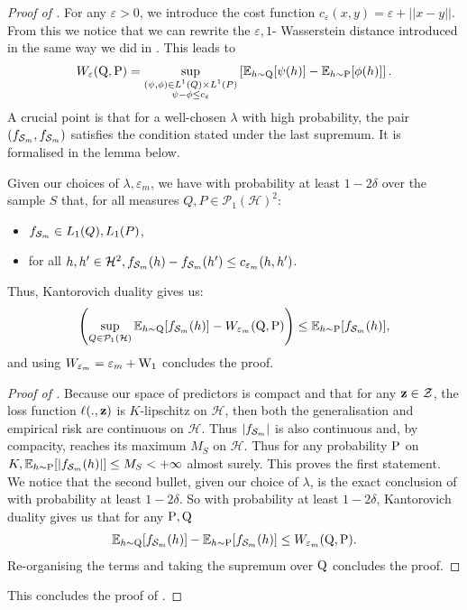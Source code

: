 \begin{noaddcontents}
\begin{proof}[Proof of ]
For any $\varepsilon>0$, we introduce the cost function $c_{\varepsilon}(x,y)= \varepsilon + ||x-y||$.
From this we notice that we can rewrite the $\varepsilon,1$- Wasserstein distance introduced in  the same way we did in . This leads to
\begin{align*}
W_\varepsilon(\Q,\P)= \sup_{\substack{(\psi, \phi) \in L^1(Q) \times L^1(P)\\ \psi-\phi \leq c_{\varepsilon}}}\left[\mathbb{E}_{h\sim \Q}[ \psi(h)]- \mathbb{E}_{h\sim \P}[ \phi(h)]\right].
\end{align*}
A crucial point is that for a well-chosen $\lambda$ with high probability, the pair $(f_{\Sm},f_{\Sm})$ satisfies the condition stated under the last supremum. It is formalised in the lemma below.
\begin{lemma}
\label{lem:kanto}
Given our choices of $\lambda,\varepsilon_m$, we have with probability at least $1-2\delta$ over the sample $S$ that, for all measures $Q,P\in\mathcal{P}_1(\mathcal{H})^2$:
\begin{itemize}
  \item $f_{\Sm}\in L_1(Q),L_1(P)$,
  \item for all $h,h' \in \mathcal{H}^2, f_{\Sm}(h)-f_{\Sm}(h') \leq c_{\varepsilon_m}(h,h')$.
\end{itemize}
Thus, Kantorovich duality gives us:
\[ \left(\sup_{Q\in \mathcal{P}_1(\mathcal{H})} \mathbb{E}_{h\sim \Q}[ f_{\Sm}(h)] -  W_{\varepsilon_m}(\Q,\P) \right)\leq \mathbb{E}_{h\sim \P}[ f_{\Sm}(h)],    \]
and using $W_{\varepsilon_m} = \varepsilon_m + \W_{1}$ concludes the proof.
\end{lemma}
\begin{proof}[Proof of ]
Because our space of predictors is compact and that for any $\z\in\mathcal{Z}$, the loss function $\ell(.,\z)$ is $K$-lipschitz on $\mathcal{H}$, then both the generalisation and empirical risk are continuous on $\mathcal{H}$. Thus $|f_{\Sm}|$ is also continuous and, by compacity, reaches its maximum $M_S$ on $\mathcal{H}$. Thus for any probability $\P$ on $K, \mathbb{E}_{h\sim \P}[|f_{\Sm}(h)|] \leq M_S < +\infty$ almost surely. This proves the first statement.
We notice that the second bullet, given our choice of $\lambda$, is the exact conclusion  of  with probability at least $1-2\delta$.
So with probability at least $1-2\delta$, Kantorovich duality gives us that for any $\P,\Q$
\begin{align*}
\mathbb{E}_{h\sim \Q}[ f_{\Sm}(h)] - \mathbb{E}_{h\sim \P}[f_{\Sm}(h)] \leq W_{\varepsilon_m}(\Q,\P).
\end{align*}
Re-organising the terms and taking the supremum over $\Q$ concludes the proof.
\end{proof}
This concludes the proof of .
\end{proof}


\end{noaddcontents}
